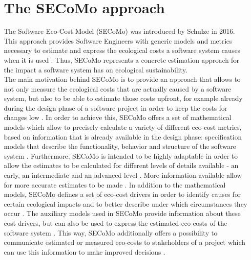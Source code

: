 \documentclass[oribibl]{llncs}
\begin{document}
\section{The SECoMo approach\label{secomo}} %
The Software Eco-Cost Model (SECoMo) was introduced by Schulze \cite{schulze_cost_2016} in 2016. This approach provides Software Engineers with generic models and metrics necessary to estimate and express the ecological costs a software system causes when it is used \cite{schulze_cost_2016}. Thus, SECoMo represents a concrete estimation approach for the impact a software system has on ecological sustainability.\\
The main motivation behind SECoMo is to provide an approach that allows to not only measure the ecological costs that are actually caused by a software system, but also to be able to estimate those costs upfront, for example already during the design phase of a software project in order to keep the costs for changes low \cite{schulze_cost_2016}. %
In order to achieve this, SECoMo offers a set of mathematical models which allow to precisely calculate a variety of different eco-cost metrics, based on information that is already available in the design phase: specification models %
that describe the functionality, behavior and structure of the software system \cite{schulze_cost_2016}. Furthermore, SECoMo is intended to be highly adaptable in order to allow the estimates to be calculated for different levels of details available - an early, an intermediate and an advanced level \cite{schulze_cost_2016}. More information available allow for more accurate estimates to be made \cite{schulze_cost_2016}. %
In addition to the mathematical models, SECoMo defines a set of eco-cost drivers in order to identify causes for certain ecological impacts and to better describe under which circumstances they occur \cite{schulze_cost_2016}. The auxiliary models used in SECoMo provide information about these cost drivers, but can also be used to express the estimated eco-costs of the software system \cite{schulze_cost_2016}. This way, SECoMo additionally offers a possibility to communicate estimated or measured eco-costs to stakeholders of a project which can use this information to make improved decisions \cite{schulze_cost_2016}.\\ %
\end{document}
